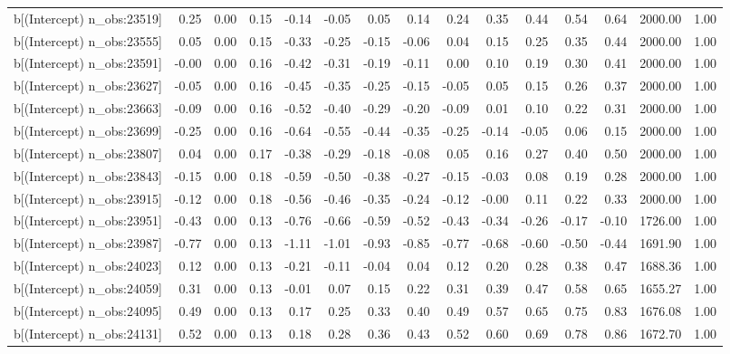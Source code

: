 \begin{table}[ht]
\begin{tabular}{rrrrrrrrrrrrrrr}
  b[(Intercept) n\_obs:23519] & 0.25 & 0.00 & 0.15 & -0.14 & -0.05 & 0.05 & 0.14 & 0.24 & 0.35 & 0.44 & 0.54 & 0.64 & 2000.00 & 1.00 \\ 
  b[(Intercept) n\_obs:23555] & 0.05 & 0.00 & 0.15 & -0.33 & -0.25 & -0.15 & -0.06 & 0.04 & 0.15 & 0.25 & 0.35 & 0.44 & 2000.00 & 1.00 \\ 
  b[(Intercept) n\_obs:23591] & -0.00 & 0.00 & 0.16 & -0.42 & -0.31 & -0.19 & -0.11 & 0.00 & 0.10 & 0.19 & 0.30 & 0.41 & 2000.00 & 1.00 \\ 
  b[(Intercept) n\_obs:23627] & -0.05 & 0.00 & 0.16 & -0.45 & -0.35 & -0.25 & -0.15 & -0.05 & 0.05 & 0.15 & 0.26 & 0.37 & 2000.00 & 1.00 \\ 
  b[(Intercept) n\_obs:23663] & -0.09 & 0.00 & 0.16 & -0.52 & -0.40 & -0.29 & -0.20 & -0.09 & 0.01 & 0.10 & 0.22 & 0.31 & 2000.00 & 1.00 \\ 
  b[(Intercept) n\_obs:23699] & -0.25 & 0.00 & 0.16 & -0.64 & -0.55 & -0.44 & -0.35 & -0.25 & -0.14 & -0.05 & 0.06 & 0.15 & 2000.00 & 1.00 \\ 
  b[(Intercept) n\_obs:23807] & 0.04 & 0.00 & 0.17 & -0.38 & -0.29 & -0.18 & -0.08 & 0.05 & 0.16 & 0.27 & 0.40 & 0.50 & 2000.00 & 1.00 \\ 
  b[(Intercept) n\_obs:23843] & -0.15 & 0.00 & 0.18 & -0.59 & -0.50 & -0.38 & -0.27 & -0.15 & -0.03 & 0.08 & 0.19 & 0.28 & 2000.00 & 1.00 \\ 
  b[(Intercept) n\_obs:23915] & -0.12 & 0.00 & 0.18 & -0.56 & -0.46 & -0.35 & -0.24 & -0.12 & -0.00 & 0.11 & 0.22 & 0.33 & 2000.00 & 1.00 \\ 
  b[(Intercept) n\_obs:23951] & -0.43 & 0.00 & 0.13 & -0.76 & -0.66 & -0.59 & -0.52 & -0.43 & -0.34 & -0.26 & -0.17 & -0.10 & 1726.00 & 1.00 \\ 
  b[(Intercept) n\_obs:23987] & -0.77 & 0.00 & 0.13 & -1.11 & -1.01 & -0.93 & -0.85 & -0.77 & -0.68 & -0.60 & -0.50 & -0.44 & 1691.90 & 1.00 \\ 
  b[(Intercept) n\_obs:24023] & 0.12 & 0.00 & 0.13 & -0.21 & -0.11 & -0.04 & 0.04 & 0.12 & 0.20 & 0.28 & 0.38 & 0.47 & 1688.36 & 1.00 \\ 
  b[(Intercept) n\_obs:24059] & 0.31 & 0.00 & 0.13 & -0.01 & 0.07 & 0.15 & 0.22 & 0.31 & 0.39 & 0.47 & 0.58 & 0.65 & 1655.27 & 1.00 \\ 
  b[(Intercept) n\_obs:24095] & 0.49 & 0.00 & 0.13 & 0.17 & 0.25 & 0.33 & 0.40 & 0.49 & 0.57 & 0.65 & 0.75 & 0.83 & 1676.08 & 1.00 \\ 
  b[(Intercept) n\_obs:24131] & 0.52 & 0.00 & 0.13 & 0.18 & 0.28 & 0.36 & 0.43 & 0.52 & 0.60 & 0.69 & 0.78 & 0.86 & 1672.70 & 1.00 \\ 

\end{tabular}
\end{table}
